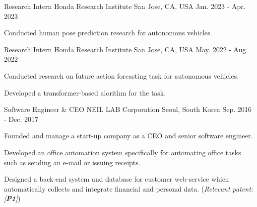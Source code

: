 


\begin{cventries}

\cventry
{Research Intern} %
{Honda Research Institute} %
{San Jose, CA, USA} %
{Jan. 2023 - Apr. 2023} %
{ %
\begin{cvitems}
\item {Conducted human pose prediction research for autonomous vehicles.}
\end{cvitems}
}

\cventry
{Research Intern} %
{Honda Research Institute} %
{San Jose, CA, USA} %
{May. 2022 - Aug. 2022} %
{ %
\begin{cvitems}
\item {Conducted research on future action forcasting task for autonomous vehicles.}
\item {Developed a transformer-based alorithm for the task.}
\end{cvitems}
}


\cventry
{Software Engineer \& CEO} %
{NEIL LAB Corporation} %
{Seoul, South Korea} %
{Sep. 2016 - Dec. 2017} %
{ %
\begin{cvitems}
\item {Founded and manage a start-up company as a CEO and senior software engineer.}
\item {Developed an office automation system specifically for automating office tasks such as sending an e-mail or issuing receipts.}
\item {Designed a back-end system and database for customer web-service which automatically collects and integrate financial and personal data. (\textit{Relevant patent: [\textbf{P1}]})}
\end{cvitems}
}



\end{cventries}
